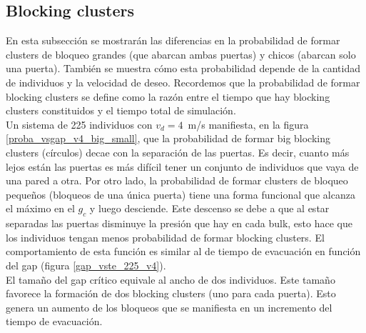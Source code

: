 \subsection{Blocking clusters}

En esta subsección se mostrarán las diferencias en la probabilidad de formar clusters de bloqueo grandes (que abarcan ambas puertas) y chicos (abarcan solo una puerta). También se muestra cómo esta probabilidad depende de la cantidad de individuos y la velocidad de deseo. Recordemos que la probabilidad de formar blocking clusters se define como la razón entre el tiempo que hay blocking clusters constituidos y el tiempo total de simulación. \\

Un sistema de 225 individuos con $v_d=4$~m/s manifiesta, en la figura \ref{proba_vsgap_v4_big_small}, que la probabilidad de formar big blocking clusters (círculos) decae con la separación de las puertas. Es decir, cuanto más lejos están las puertas es más difícil tener un conjunto de individuos que vaya de una pared a otra.
Por otro lado, la probabilidad de formar clusters de bloqueo pequeños (bloqueos de una única puerta) tiene una forma funcional que alcanza el máximo en el $g_c$ y luego desciende. Este descenso se debe a que al estar separadas las puertas disminuye la presión que hay en cada bulk, esto hace que los individuos tengan menos probabilidad de formar blocking clusters. El comportamiento de esta función es similar al de tiempo de evacuación en función del gap (figura \ref{gap_vste_225_v4}).\\

El tamaño del gap crítico equivale al ancho de dos individuos. Este tamaño favorece la formación de dos blocking clusters (uno para cada puerta). Esto genera un aumento de los bloqueos que se manifiesta en un incremento del tiempo de evacuación. 


